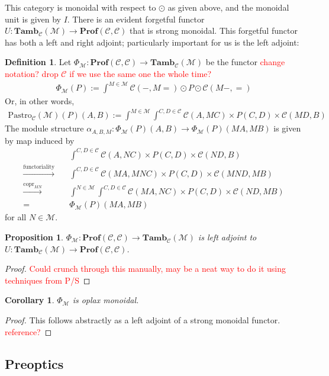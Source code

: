 \documentclass[11pt,a4paper]{article}
\theoremstyle{plain}
\newtheorem{proposition}[theorem]{Proposition}
\newtheorem{corollary}[theorem]{Corollary}
\theoremstyle{definition}
\newtheorem{definition}[theorem]{Definition}
\newcommand{\C}{\mathscr{C}}
\newcommand{\M}{\mathscr{M}}
\newcommand{\Pastro}{\Phi}
\newcommand{\Prof}{\mathbf{Prof}}
\newcommand{\Tamb}{\mathbf{Tamb}}
\DeclareMathOperator{\copr}{copr}
\newcommand{\todo}[1]{\textcolor{red}{\small #1}}
\begin{document}
This category is monoidal with respect to $\odot$ as given above, and the monoidal unit is given by $I$. There is an evident forgetful functor $U : \Tamb_\C(\M) \to \Prof(\C, \C)$ that is strong monoidal. This forgetful functor has both a left and right adjoint; particularly important for us is the left adjoint:

\begin{definition}
Let $\Pastro_\M : \Prof(\C, \C) \to \Tamb_\C(\M)$ be the functor \todo{change notation? drop $\C$ if we use the same one the whole time?}
\begin{align*}
\Pastro_\M(P) := \int^{M \in \M}  \C(-, M{=}) \odot P \odot \C(M-, {=}) 
\end{align*}
Or, in other words, 
\begin{align*}
\mathrm{Pastro}_\C(\M)(P)(A,B) := \int^{M \in \M} \int^{C,D \in \C} \C(A, MC) \times P(C,D) \times  \C(MD, B)
\end{align*}
The module structure $\alpha_{A,B,M} : \Pastro_\M(P)(A,B) \to \Pastro_\M(P)(MA, MB)
$ is given by map induced by 
\begin{align*}
&\int^{C,D \in \C} \C(A, NC) \times P(C,D) \times  \C(ND, B) \\
\xrightarrow{\text{functoriality}} \quad& \int^{C,D \in \C} \C(MA, MNC) \times P(C,D) \times  \C(MND, MB) \\
\xrightarrow{\copr_{MN}} \quad&\int^{N \in \M} \int^{C,D \in \C} \C(MA, NC) \times P(C,D) \times  \C(ND, MB) \\
= \quad&\Pastro_\M(P)(MA, MB)
\end{align*}
for all $N \in \M$.
\end{definition}

\begin{proposition}
$\Pastro_\M : \Prof(\C, \C) \to \Tamb_\C(\M)$ is left adjoint to $U : \Tamb_\C(\M) \to \Prof(\C, \C)$.
\end{proposition}
\begin{proof}
\todo{Could crunch through this manually, may be a neat way to do it using techniques from P/S}
\end{proof}

\begin{corollary}
$\Pastro_\M$ is oplax monoidal.
\end{corollary}
\begin{proof}
This follows abstractly as a left adjoint of a strong monoidal functor. \todo{reference?}
\end{proof}

\subsection{Preoptics}
\end{document}
